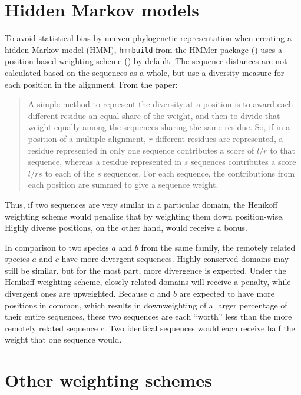 \section{Hidden Markov models}

To avoid statistical bias by uneven phylogenetic representation when creating a
hidden Markov model (HMM), \texttt{hmmbuild} from the HMMer package
(\cite{eddy2009}) uses a position-based weighting scheme (\cite{henikoff1994})
by default: The sequence distances are not calculated based on the sequences as
a whole, but use a diversity measure for each position in the alignment. From
the paper:

\begin{quote}
	A simple method to represent the diversity at a position is to award each
	different residue an equal share of the weight, and then to divide that
	weight equally among the sequences sharing the same residue. So, if in a
	position of a multiple alignment, $r$ different residues are represented, a
	residue represented in only one sequence contributes a score of $l/r$ to that
	sequence, whereas a residue represented in $s$ sequences contributes a score
	$l/rs$ to each of the $s$ sequences. For each sequence, the contributions
	from each position are summed to give a sequence weight.
\end{quote}

Thus, if two sequences are very similar in a particular domain, the Henikoff
weighting scheme would penalize that by weighting them down position-wise.
Highly diverse positions, on the other hand, would receive a bonus. 

In comparison to two species $a$ and $b$ from the same family, the remotely
related species $a$ and $c$ have more divergent sequences. Highly conserved
domains may still be similar, but for the most part, more divergence is
expected. Under the Henikoff weighting scheme, closely related domains will
receive a penalty, while divergent ones are upweighted. Because $a$ and $b$ are
expected to have more positions in common, which results in downweighting of a
larger percentage of their entire sequences, these two sequences are each
``worth'' less than the more remotely related sequence $c$. Two identical
sequences would each receive half the weight that one sequence would.

\section*{Other weighting schemes}

